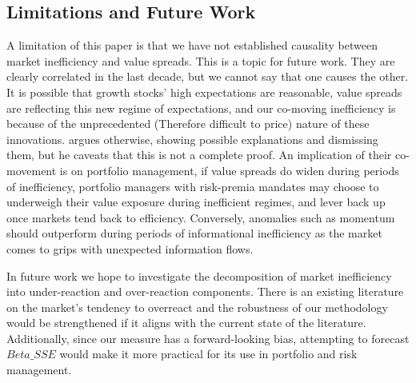 \subsection{Limitations and Future Work}
A limitation of this paper is that we have not established causality between market inefficiency and value spreads. This is a topic for future work.
They are clearly correlated in the last decade, but we cannot say that one causes the other. It is possible that 
growth stocks' high expectations are reasonable, value spreads are reflecting this new regime of expectations, and our co-moving inefficiency
is because of the unprecedented (Therefore difficult to price) nature of these innovations. \citet{asness_2024} argues otherwise, showing possible explanations and dismissing them, but he caveats that this
is not a complete proof. An implication of their co-movement is on portfolio management, if value spreads do widen during periods of inefficiency, portfolio managers with risk-premia mandates may choose to underweigh their value exposure during inefficient regimes, and lever back up once 
markets tend back to efficiency. Conversely, anomalies such as momentum should outperform during periods of informational inefficiency as the 
market comes to grips with unexpected information flows.

In future work we hope to investigate the decomposition of market inefficiency into under-reaction and over-reaction components.
There is an existing literature on the market's tendency to overreact and the robustness of our methodology would be strengthened if it aligns with
the current state of the literature. Additionally, since our measure has a forward-looking bias, attempting to forecast $Beta\_SSE$ would make it 
more practical for its use in portfolio and risk management.